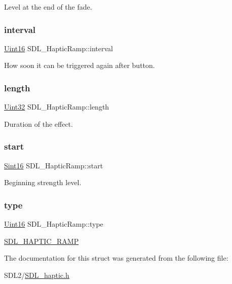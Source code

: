 Level at the end of the fade. \mbox{\label{struct_s_d_l___haptic_ramp_a4b89d108cfa7e96ea58b58771334c33d}} 
\subsubsection{\texorpdfstring{interval}{interval}}
{\footnotesize\ttfamily \hyperlink{_s_d_l__stdinc_8h_a31fcc0a076c9068668173ee26d33e42b}{Uint16} S\+D\+L\+\_\+\+Haptic\+Ramp\+::interval}

How soon it can be triggered again after button. \mbox{\label{struct_s_d_l___haptic_ramp_a57e75237507701405af2a3caf34cdb5a}} 
\subsubsection{\texorpdfstring{length}{length}}
{\footnotesize\ttfamily \hyperlink{_s_d_l__stdinc_8h_add440eff171ea5f55cb00c4a9ab8672d}{Uint32} S\+D\+L\+\_\+\+Haptic\+Ramp\+::length}

Duration of the effect. \mbox{\label{struct_s_d_l___haptic_ramp_acc0e813ac6399290fd4a788d2471e8d4}} 
\subsubsection{\texorpdfstring{start}{start}}
{\footnotesize\ttfamily \hyperlink{_s_d_l__stdinc_8h_a9d0257032c0e146ab6121bf0122712f5}{Sint16} S\+D\+L\+\_\+\+Haptic\+Ramp\+::start}

Beginning strength level. \mbox{\label{struct_s_d_l___haptic_ramp_aca1c2349372433822ab62f60976640aa}} 
\subsubsection{\texorpdfstring{type}{type}}
{\footnotesize\ttfamily \hyperlink{_s_d_l__stdinc_8h_a31fcc0a076c9068668173ee26d33e42b}{Uint16} S\+D\+L\+\_\+\+Haptic\+Ramp\+::type}

\hyperlink{_s_d_l__haptic_8h_af10eb937a64a8f602e9c46682ac0d868}{S\+D\+L\+\_\+\+H\+A\+P\+T\+I\+C\+\_\+\+R\+A\+MP} 

The documentation for this struct was generated from the following file\+:\begin{DoxyCompactItemize}
\item 
S\+D\+L2/\hyperlink{_s_d_l__haptic_8h}{S\+D\+L\+\_\+haptic.\+h}\end{DoxyCompactItemize}
